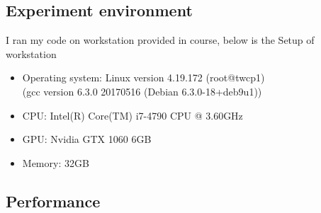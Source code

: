 \documentclass{article}
\begin{document}
	\subsection{Experiment environment}
	I ran my code on workstation provided in course, below is the Setup of workstation
	\begin{itemize}
		\item Operating system: Linux version 4.19.172 (root@twcp1)\\(gcc version 6.3.0 20170516 (Debian 6.3.0-18+deb9u1))
		\item CPU: Intel(R) Core(TM) i7-4790 CPU @ 3.60GHz
		\item GPU: Nvidia GTX 1060 6GB
		\item Memory: 32GB 
	\end{itemize}
	\subsection{Performance}
\end{document}
